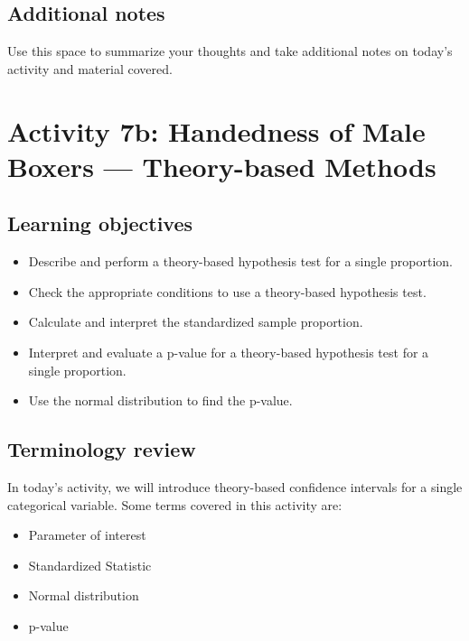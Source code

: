 \documentclass[
]{report}
\begin{document}
\hypertarget{additional-notes-9}{%
\subsection{Additional notes}\label{additional-notes-9}}

Use this space to summarize your thoughts and take additional notes on today's activity and material covered.

\newpage

\hypertarget{activity-7b-handedness-of-male-boxers-theory-based-methods}{%
\section{Activity 7b: Handedness of Male Boxers --- Theory-based Methods}\label{activity-7b-handedness-of-male-boxers-theory-based-methods}}


\hypertarget{learning-objectives-8}{%
\subsection{Learning objectives}\label{learning-objectives-8}}

\begin{itemize}
\item
  Describe and perform a theory-based hypothesis test for a single proportion.
\item
  Check the appropriate conditions to use a theory-based hypothesis test.
\item
  Calculate and interpret the standardized sample proportion.
\item
  Interpret and evaluate a p-value for a theory-based hypothesis test for a single proportion.
\item
  Use the normal distribution to find the p-value.
\end{itemize}

\hypertarget{terminology-review-10}{%
\subsection{Terminology review}\label{terminology-review-10}}

In today's activity, we will introduce theory-based confidence intervals for a single categorical variable. Some terms covered in this activity are:

\begin{itemize}
\item
  Parameter of interest
\item
  Standardized Statistic
\item
  Normal distribution
\item
  p-value
\end{itemize}
\end{document}
